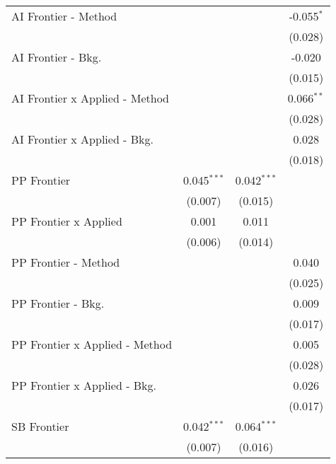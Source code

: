 \begin{tabular}{lccc}
   AI Frontier - Method           &               &               & -0.055$^{*}$\\   
                                  &               &               & (0.028)\\   
   AI Frontier - Bkg.             &               &               & -0.020\\   
                                  &               &               & (0.015)\\   
   AI Frontier x Applied - Method &               &               & 0.066$^{**}$\\   
                                  &               &               & (0.028)\\   
   AI Frontier x Applied - Bkg.   &               &               & 0.028\\   
                                  &               &               & (0.018)\\   
   PP Frontier                    & 0.045$^{***}$ & 0.042$^{***}$ &   \\   
                                  & (0.007)       & (0.015)       &   \\   
   PP Frontier x Applied          & 0.001         & 0.011         &   \\   
                                  & (0.006)       & (0.014)       &   \\   
   PP Frontier - Method           &               &               & 0.040\\   
                                  &               &               & (0.025)\\   
   PP Frontier - Bkg.             &               &               & 0.009\\   
                                  &               &               & (0.017)\\   
   PP Frontier x Applied - Method &               &               & 0.005\\   
                                  &               &               & (0.028)\\   
   PP Frontier x Applied - Bkg.   &               &               & 0.026\\   
                                  &               &               & (0.017)\\   
   SB Frontier                    & 0.042$^{***}$ & 0.064$^{***}$ &   \\   
                                  & (0.007)       & (0.016)       &   \\   

\end{tabular}
